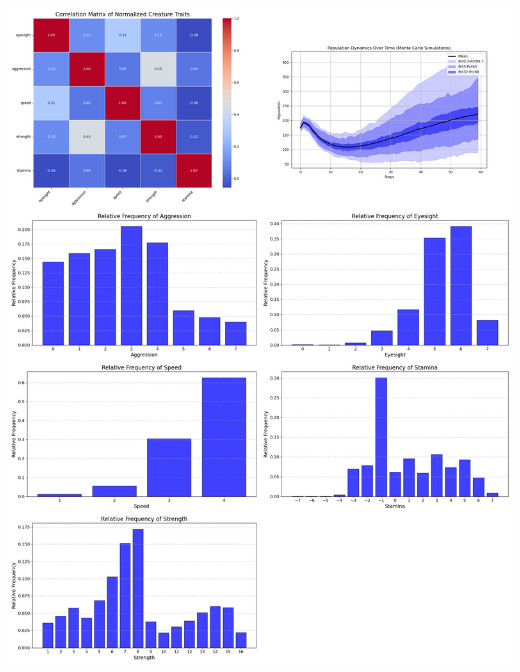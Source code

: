 \documentclass{article}
\begin{document}
\begin{center}
    \includegraphics[scale=0.21]{tests/2.6.jpg}
\end{center}
\end{document}
